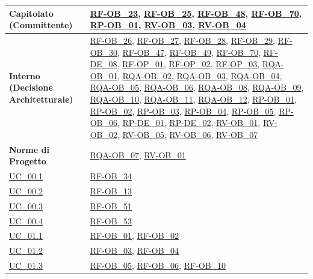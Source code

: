 \begin{longtable}{|>{\raggedright}p{}|>{\raggedright\arraybackslash}p{}|}
    \hline
    \textbf{Capitolato (Committente)} & \hyperlink{rf-ob_23}{RF-OB\_23}, \hyperlink{rf-ob_25}{RF-OB\_25}, \hyperlink{rf-ob_48}{RF-OB\_48}, \hyperlink{rf-ob_70}{RF-OB\_70}, \hyperlink{rp-ob_1}{RP-OB\_01}, \hyperlink{rv-ob_3}{RV-OB\_03}, \hyperlink{rv-ob_4}{RV-OB\_04} \\
    \hline
    \textbf{Interno (Decisione Architetturale)} & \hyperlink{rf-ob_26}{RF-OB\_26}, \hyperlink{rf-ob_27}{RF-OB\_27}, \hyperlink{rf-ob_28}{RF-OB\_28}, \hyperlink{rf-ob_29}{RF-OB\_29}, \hyperlink{rf-ob_30}{RF-OB\_30}, \hyperlink{rf-ob_47}{RF-OB\_47}, \hyperlink{rf-ob_49}{RF-OB\_49}, \hyperlink{rf-ob_70}{RF-OB\_70}, \hyperlink{rf-de_8}{RF-DE\_08}, \hyperlink{rf-op_1}{RF-OP\_01}, \hyperlink{rf-op_2}{RF-OP\_02}, \hyperlink{rf-op_3}{RF-OP\_03}, \hyperlink{rqa-ob_1}{RQA-OB\_01}, \hyperlink{rqa-ob_2}{RQA-OB\_02}, \hyperlink{rqa-ob_3}{RQA-OB\_03}, \hyperlink{rqa-ob_4}{RQA-OB\_04}, \hyperlink{rqa-ob_5}{RQA-OB\_05}, \hyperlink{rqa-ob_6}{RQA-OB\_06}, \hyperlink{rqa-ob_8}{RQA-OB\_08}, \hyperlink{rqa-ob_9}{RQA-OB\_09}, \hyperlink{rqa-ob_10}{RQA-OB\_10}, \hyperlink{rqa-ob_11}{RQA-OB\_11}, \hyperlink{rqa-ob_12}{RQA-OB\_12}, \hyperlink{rp-ob_1}{RP-OB\_01}, \hyperlink{rp-ob_2}{RP-OB\_02}, \hyperlink{rp-ob_3}{RP-OB\_03}, \hyperlink{rp-ob_4}{RP-OB\_04}, \hyperlink{rp-ob_5}{RP-OB\_05}, \hyperlink{rp-ob_6}{RP-OB\_06}, \hyperlink{rp-de_1}{RP-DE\_01}, \hyperlink{rp-de_2}{RP-DE\_02}, \hyperlink{rv-ob_1}{RV-OB\_01}, \hyperlink{rv-ob_2}{RV-OB\_02}, \hyperlink{rv-ob_5}{RV-OB\_05}, \hyperlink{rv-ob_6}{RV-OB\_06}, \hyperlink{rv-ob_7}{RV-OB\_07} \\
    \hline
    \textbf{Norme di Progetto} & \hyperlink{rqa-ob_7}{RQA-OB\_07}, \hyperlink{rv-ob_1}{RV-OB\_01} \\
    \hline
    \hyperref[uc_00.1]{UC\_00.1} & \hyperlink{rf-ob_34}{RF-OB\_34} \\
    \hline
    \hyperref[uc_00.2]{UC\_00.2} & \hyperlink{rf-ob_13}{RF-OB\_13} \\
    \hline
    \hyperref[uc_00.3]{UC\_00.3} & \hyperlink{rf-ob_51}{RF-OB\_51} \\
    \hline
    \hyperref[uc_00.4]{UC\_00.4} & \hyperlink{rf-ob_53}{RF-OB\_53} \\
    \hline
    \hyperref[uc_01.1]{UC\_01.1} & \hyperlink{rf-ob_1}{RF-OB\_01}, \hyperlink{rf-ob_2}{RF-OB\_02} \\
    \hline
    \hyperref[uc_01.2]{UC\_01.2} & \hyperlink{rf-ob_3}{RF-OB\_03}, \hyperlink{rf-ob_4}{RF-OB\_04} \\
    \hline
    \hyperref[uc_01.3]{UC\_01.3} & \hyperlink{rf-ob_5}{RF-OB\_05}, \hyperlink{rf-ob_6}{RF-OB\_06}, \hyperlink{rf-ob_10}{RF-OB\_10} \\

\end{longtable}
